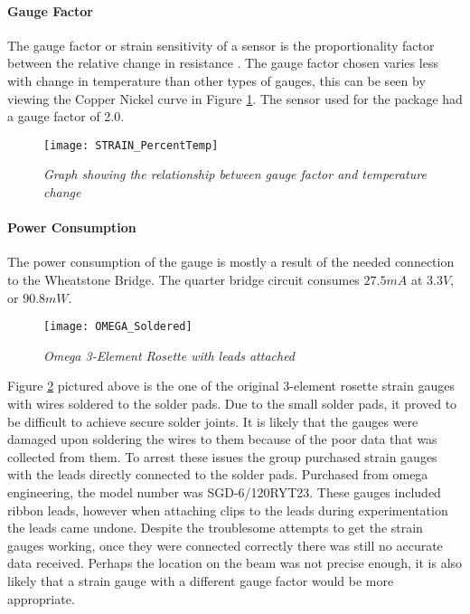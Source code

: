 \paragraph{Gauge Factor}
\indent The gauge factor or strain sensitivity of a sensor is the proportionality factor between the relative change in resistance . The gauge factor chosen varies less with change in temperature than other types of gauges, this can be seen by viewing the Copper Nickel curve in Figure \ref{fig:STRAIN_GFvT}. The sensor used for the package had a gauge factor of 2.0.

\begin{figure}
\centering
\texttt{[image: STRAIN\_PercentTemp]}
\caption{\textit{Graph showing the relationship between gauge factor and temperature change}\cite{OmegaEngineeering:2013}}
\label{fig:STRAIN_GFvT}
\end{figure}

\paragraph{Power Consumption}
\indent The power consumption of the gauge is mostly a result of the needed connection to the Wheatstone Bridge. The quarter bridge circuit consumes $27.5 mA$ at $3.3V$, or $90.8mW$.



\begin{figure}[H]
\centering
\texttt{[image: OMEGA\_Soldered]}
\caption{\textit{Omega 3-Element Rosette with leads attached}}
\label{fig:Soldered Strain Gauge}
\end{figure}

\indent Figure \ref{fig:Soldered Strain Gauge} pictured above is the one of the original 3-element rosette strain gauges with wires soldered to the solder pads. Due to the small solder pads, it proved to be difficult to achieve secure solder joints. It is likely that the gauges were damaged upon soldering the wires to them because of the poor data that was collected from them. To arrest these issues the group purchased strain gauges with the leads directly connected to the solder pads. Purchased from omega engineering, the model number was SGD-6/120RYT23. These gauges included ribbon leads, however when attaching clips to the leads during experimentation the leads came undone. Despite the troublesome attempts to get the strain gauges working, once they were connected correctly there was still no accurate data received. Perhaps the location on the beam was not precise enough, it is also likely that a strain gauge with a different gauge factor would be more appropriate.